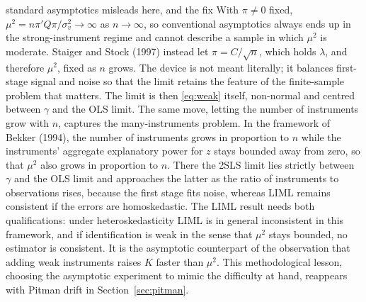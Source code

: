 \documentclass[11pt,a4paper]{article}
\begin{document}
\begin{whybox}{standard asymptotics misleads here, and the fix}
With $\pi\neq0$ fixed, $\mu^2=n\pi'Q\pi/\sigma_v^2\to\infty$ as $n\to\infty$, so conventional asymptotics always ends up in the strong-instrument regime and cannot describe a sample in which $\mu^2$ is moderate. Staiger and Stock (1997) instead let $\pi=C/\sqrt n$, which holds $\lambda$, and therefore $\mu^2$, fixed as $n$ grows. The device is not meant literally; it balances first-stage signal and noise so that the limit retains the feature of the finite-sample problem that matters. The limit is then \eqref{eq:weak} itself, non-normal and centred between $\gamma$ and the OLS limit. The same move, letting the number of instruments grow with $n$, captures the many-instruments problem. In the framework of Bekker (1994), the number of instruments grows in proportion to $n$ while the instruments' aggregate explanatory power for $z$ stays bounded away from zero, so that $\mu^2$ also grows in proportion to $n$. There the 2SLS limit lies strictly between $\gamma$ and the OLS limit and approaches the latter as the ratio of instruments to observations rises, because the first stage fits noise, whereas LIML remains consistent if the errors are homoskedastic. The LIML result needs both qualifications: under heteroskedasticity LIML is in general inconsistent in this framework, and if identification is weak in the sense that $\mu^2$ stays bounded, no estimator is consistent. It is the asymptotic counterpart of the observation that adding weak instruments raises $K$ faster than $\mu^2$. This methodological lesson, choosing the asymptotic experiment to mimic the difficulty at hand, reappears with Pitman drift in Section~\ref{sec:pitman}.
\end{whybox}
\end{document}
